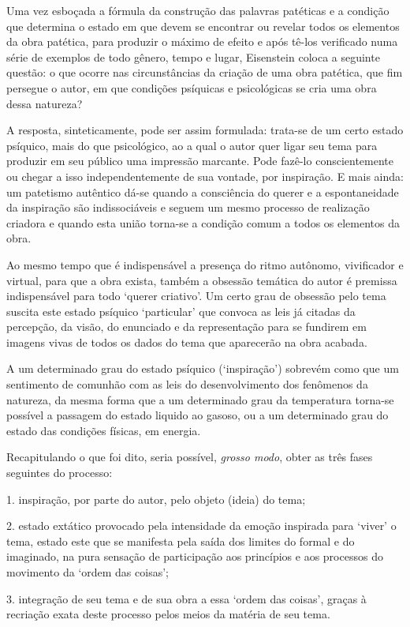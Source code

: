 Uma vez esboçada a fórmula da construção das palavras patéticas e a
condição que determina o estado em que devem se encontrar ou revelar
todos os elementos da obra patética, para produzir o máximo de efeito e
após tê-los verificado numa série de exemplos de todo gênero, tempo e
lugar, Eisenstein coloca a seguinte questão: o que ocorre nas
circunstâncias da criação de uma obra patética, que fim persegue o
autor, em que condições psíquicas e psicológicas se cria uma obra dessa
natureza?

A resposta, sinteticamente, pode ser assim formulada: trata-se de um
certo estado psíquico, mais do que psicológico, ao a qual o autor quer
ligar seu tema para produzir em seu público uma impressão marcante. Pode
fazê-lo conscientemente ou chegar a isso independentemente de sua
vontade, por inspiração. E mais ainda: um patetismo autêntico dá-se
quando a consciência do querer e a espontaneidade da inspiração são
indissociáveis e seguem um mesmo processo de realização criadora e
quando esta união torna-se a condição comum a todos os elementos da
obra.

Ao mesmo tempo que é indispensável a presença do ritmo autônomo,
vivificador e virtual, para que a obra exista, também a obsessão
temática do autor é premissa indispensável para todo `querer criativo'.
Um certo grau de obsessão pelo tema suscita este estado psíquico
`particular' que convoca as leis já citadas da percepção, da visão, do
enunciado e da representação para se fundirem em imagens vivas de todos
os dados do tema que aparecerão na obra acabada.

A um determinado grau do estado psíquico (`inspiração') sobrevém como
que um sentimento de comunhão com as leis do desenvolvimento dos
fenômenos da natureza, da mesma forma que a um determinado grau da
temperatura torna-se possível a passagem do estado liquido ao gasoso, ou
a um determinado grau do estado das condições físicas, em energia.

Recapitulando o que foi dito, seria possível, \emph{grosso modo}, obter
as três fases seguintes do processo:

1. inspiração, por parte do autor, pelo objeto (ideia) do tema;

2. estado extático provocado pela intensidade da emoção inspirada para
`viver' o tema, estado este que se manifesta pela saída dos limites do
formal e do imaginado, na pura sensação de participação aos princípios e
aos processos do movimento da `ordem das coisas';

3. integração de seu tema e de sua obra a essa `ordem das coisas',
graças à recriação exata deste processo pelos meios da matéria de seu
tema.

